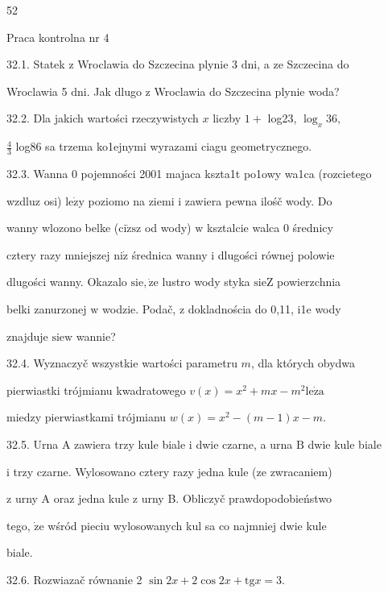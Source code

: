 \documentclass[a4paper,12pt]{article}
\begin{document}
52

Praca kontrolna nr 4

32.1. Statek $\mathrm{z}$ Wroclawia do Szczecina plynie 3 $\mathrm{d}\mathrm{n}\mathrm{i}$, a ze Szczecina do

Wroclawia 5 $\mathrm{d}\mathrm{n}\mathrm{i}$. Jak dlugo $\mathrm{z}$ Wroclawia do Szczecina plynie woda?

32.2. Dla jakich wartości rzeczywistych $x$ liczby $1 +$ log23, $\log_{x}36,$

$\displaystyle \frac{4}{3}$ log86 sa trzema ko1ejnymi wyrazami ciagu geometrycznego.

32.3. Wanna $0$ pojemności 2001 majaca kszta1t po1owy wa1ca (rozcietego

wzdluz osi) $\mathrm{l}\mathrm{e}\dot{\mathrm{z}}\mathrm{y}$ poziomo na ziemi $\mathrm{i}$ zawiera pewna ilośč wody. Do

wanny wlozono belke ($\mathrm{c}\mathrm{i}\dot{\mathrm{z}}\mathrm{s}\mathrm{z}$ od wody) $\mathrm{w}$ ksztalcie walca $0$ średnicy

cztery razy mniejszej $\mathrm{n}\mathrm{i}\dot{\mathrm{z}}$ średnica wanny $\mathrm{i}$ dlugości równej polowie

dlugości wanny. Okazalo $\mathrm{s}\mathrm{i}\mathrm{e}, \dot{\mathrm{z}}\mathrm{e}$ lustro wody styka $\mathrm{s}\mathrm{i}\mathrm{e}\mathrm{Z}$ powierzchnia

belki zanurzonej $\mathrm{w}$ wodzie. Podač, $\mathrm{z}$ dokladnościa do 0,11, i1e wody

znajduje $\mathrm{s}\mathrm{i}\mathrm{e}\mathrm{w}$ wannie?

32.4. Wyznaczyč wszystkie wartości parametru $m$, dla których obydwa

pierwiastki trójmianu kwadratowego $v(x) = x^{2}+mx-m^{2} \mathrm{l}\mathrm{e}\dot{\mathrm{z}}\mathrm{a}$

miedzy pierwiastkami trójmianu $w(x)=x^{2}-(m-1)x-m.$

32.5. Urna A zawiera trzy kule biale $\mathrm{i}$ dwie czarne, a urna $\mathrm{B}$ dwie kule biale

$\mathrm{i}$ trzy czarne. Wylosowano cztery razy jedna kule (ze zwracaniem)

$\mathrm{z}$ urny A oraz jedna kule $\mathrm{z}$ urny B. Obliczyč prawdopodobieństwo

tego, $\dot{\mathrm{z}}\mathrm{e}$ wśród pieciu wylosowanych kul sa co najmniej dwie kule

biale.

32.6. Rozwiazač równanie 2 $\sin 2x+2\cos 2x+\mathrm{t}\mathrm{g}x=3.$
\end{document}

